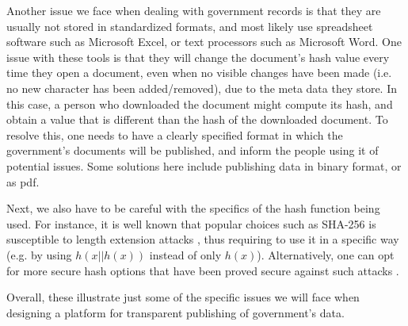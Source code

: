 Another issue we face when dealing with government records is that they are usually not stored in standardized formats, and most likely use spreadsheet software such as Microsoft Excel, or text processors such as Microsoft Word. One issue with these tools is that they will change the document's hash value every time they open a document, even when no visible changes have been made (i.e. no new character has been added/removed), due to the meta data they store. In this case, a person who downloaded the document might compute its hash, and obtain a value that is different than the hash of the downloaded document. To resolve this, one needs to have a clearly specified format in which the government's documents will be published, and inform the people using it of potential issues. Some solutions here include publishing data in binary format, or as pdf.

Next, we also have to be careful with the specifics of the hash function being used. For instance, it is well known that popular choices such as SHA-256 is susceptible to length extension attacks \cite{lengthextension}, thus requiring to use it in a specific way (e.g. by using $h(x||h(x))$ instead of only $h(x)$). Alternatively, one can opt for more secure hash options that have been proved secure against such attacks \cite{keccak}.

Overall, these illustrate just some of the specific issues we will face when designing a platform for transparent publishing of government's data.


